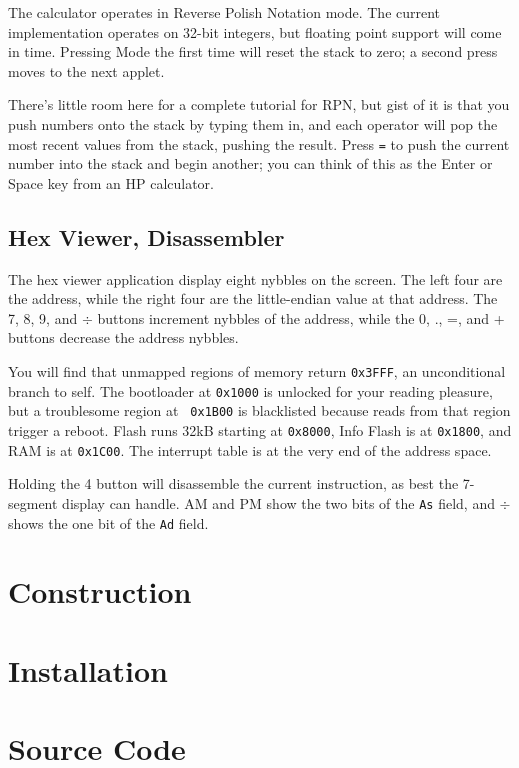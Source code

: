 \documentclass{article}
\begin{document}
\begin{multicols}{2}
The calculator operates in Reverse Polish Notation mode.  The current
implementation operates on 32-bit integers, but floating point support
will come in time.  Pressing Mode the first time will reset the stack
to zero; a second press moves to the next applet.

There's little room here for a complete tutorial for RPN, but gist of
it is that you push numbers onto the stack by typing them in, and each
operator will pop the most recent values from the stack, pushing the
result.  Press {\tt =} to push the current number into the stack and
begin another; you can think of this as the Enter or Space key from an
HP calculator.

\subsection*{Hex Viewer, Disassembler}

The hex viewer application display eight nybbles on the screen.  The
left four are the address, while the right four are the little-endian
value at that address.  The 7, 8, 9, and $\div$ buttons increment
nybbles of the address, while the 0, ., =, and + buttons decrease the
address nybbles.

You will find that unmapped regions of memory return {\tt 0x3FFF}, an
unconditional branch to self.  The bootloader at {\tt 0x1000} is
unlocked for your reading pleasure, but a troublesome region at {\tt
  0x1B00} is blacklisted because reads from that region trigger a
reboot.  Flash runs 32kB starting at {\tt 0x8000}, Info Flash is at
{\tt 0x1800}, and RAM is at {\tt 0x1C00}.  The interrupt table is at
the very end of the address space.

Holding the 4 button will disassemble the current instruction, as best
the 7-segment display can handle.  AM and PM show the two bits of the
{\tt As} field, and $\div{}$ shows the one bit of the {\tt Ad} field.



\section{Construction}

\section{Installation}

\section{Source Code}



\end{multicols}
\end{document}
